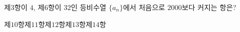 제$3$항이 $4$, 제$6$항이 $32$인 등비수열 $\{a_n\}$에서 처음으로 $2000$보다 커지는 항은?
\begin{choices32}{제$10$항}{제$11$항}{제$12$항}{제$13$항}{제$14$항}\end{choices32}
